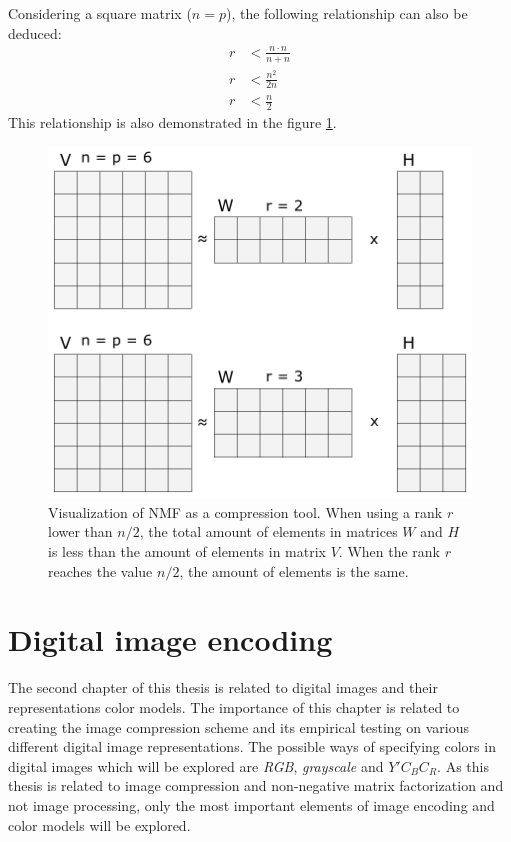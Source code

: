 \documentclass[thesis=M,english]{FITthesis}[2012/10/20]
\begin{document}
Considering a square matrix ($n = p$), the following relationship can also
be deduced:
\begin{align*}
  r &< \frac{n \cdot n}{n + n}\\
  r &< \frac{n^{2}}{2n}\\
  r &< \frac{n}{2}
\end{align*}
This relationship is also demonstrated in the figure \ref{fig:maxrank}.

\begin{figure}[h]
  \centering
  \includegraphics[scale=0.7]{maxrank}
  \caption[Visualization of NMF as a compression tool]{Visualization of NMF as a compression tool. When using a rank $r$ lower than $n/2$, the
           total amount of elements in matrices $W$ and $H$ is less than the amount of elements in
           matrix $V$. When the rank $r$ reaches the value $n/2$, the amount of elements is the same.}
  \label{fig:maxrank}
\end{figure}



\chapter{Digital image encoding}
\label{ch:image-encoding}
The second chapter of this thesis is related to digital images and their
representations color models. The importance of this chapter is related to
creating the image compression scheme and its empirical testing on
various different digital image representations. The possible ways of
specifying colors in digital images which will be explored are \emph{RGB},
\emph{grayscale} and $Y'C_BC_R$. As this thesis is related to image
compression and non-negative matrix factorization and not image processing,
only the most important elements of image encoding and color models will be explored.
\end{document}
